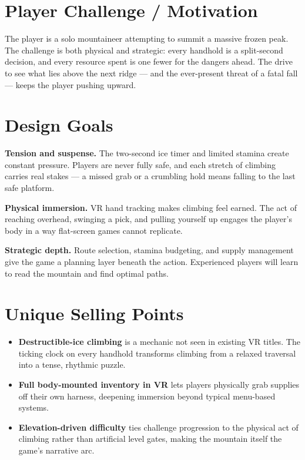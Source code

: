 \documentclass[12pt]{article}
\begin{document}
\section{Player Challenge / Motivation}

The player is a solo mountaineer attempting to summit a massive frozen peak. The challenge is both physical and strategic: every handhold is a split-second decision, and every resource spent is one fewer for the dangers ahead. The drive to see what lies above the next ridge --- and the ever-present threat of a fatal fall --- keeps the player pushing upward.

\section{Design Goals}

\textbf{Tension and suspense.} The two-second ice timer and limited stamina create constant pressure. Players are never fully safe, and each stretch of climbing carries real stakes --- a missed grab or a crumbling hold means falling to the last safe platform.

\textbf{Physical immersion.} VR hand tracking makes climbing feel earned. The act of reaching overhead, swinging a pick, and pulling yourself up engages the player's body in a way flat-screen games cannot replicate.

\textbf{Strategic depth.} Route selection, stamina budgeting, and supply management give the game a planning layer beneath the action. Experienced players will learn to read the mountain and find optimal paths.

\section{Unique Selling Points}

\begin{itemize}[leftmargin=2em]
    \item \textbf{Destructible-ice climbing} is a mechanic not seen in existing VR titles. The ticking clock on every handhold transforms climbing from a relaxed traversal into a tense, rhythmic puzzle.
    \item \textbf{Full body-mounted inventory in VR} lets players physically grab supplies off their own harness, deepening immersion beyond typical menu-based systems.
    \item \textbf{Elevation-driven difficulty} ties challenge progression to the physical act of climbing rather than artificial level gates, making the mountain itself the game's narrative arc.
\end{itemize}
\end{document}
